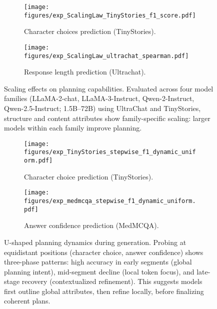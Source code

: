 \begin{figure*}[tb!] 
    \centering
    \begin{subfigure}[b]{0.49\linewidth}
        \centering
        \texttt{[image: figures/exp\_ScalingLaw\_TinyStories\_f1\_score.pdf]}
        \caption{Character choices prediction (TinyStories).}
    \end{subfigure}
    \hfill  %
    \begin{subfigure}[b]{0.49\linewidth}
        \centering
        \texttt{[image: figures/exp\_ScalingLaw\_ultrachat\_spearman.pdf]}
        \caption{Response length prediction (Ultrachat).}
    \end{subfigure}
    \vspace{-5pt}
    \caption{Scaling effects on planning capabilities. Evaluated across four model families (LLaMA-2-chat, LLaMA-3-Instruct, Qwen-2-Instruct, Qwen-2.5-Instruct; 1.5B–72B) using UltraChat and TinyStories, structure and content attributes show family-specific scaling: larger models within each family improve planning.}
    \label{fig:exp_ablation_scaling}
    \vspace{-5pt}
\end{figure*}

\begin{figure*}[tb!] 
    \centering
    \begin{subfigure}[b]{0.48\linewidth}
        \centering
        \texttt{[image: figures/exp\_TinyStories\_stepwise\_f1\_dynamic\_uniform.pdf]}
        \caption{Character choice prediction (TinyStories).}
    \end{subfigure}
    \hfill  %
    \begin{subfigure}[b]{0.48\linewidth}
        \centering
        \texttt{[image: figures/exp\_medmcqa\_stepwise\_f1\_dynamic\_uniform.pdf]}
        \caption{Answer confidence prediction (MedMCQA).}
    \end{subfigure}
    \vspace{-10pt}
    \caption{U-shaped planning dynamics during generation. Probing at equidistant positions (character choice, answer confidence) shows three-phase patterns: high accuracy in early segments (global planning intent), mid-segment decline (local token focus), and late-stage recovery (contextualized refinement). This suggests models first outline global attributes, then refine locally, before finalizing coherent plans.}
    \label{fig:exp_ablation_dynamics}
    \vspace{-10pt}
\end{figure*}

